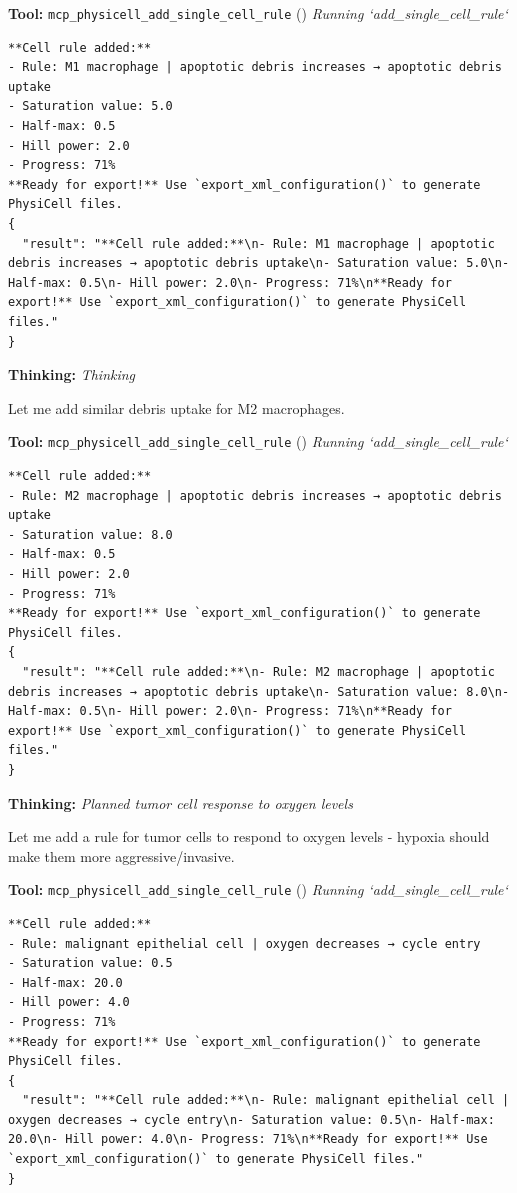\documentclass[11pt,a4paper]{article}
\begin{document}
\begin{toolokbox}
\textbf{Tool:} \texttt{mcp\_physicell\_add\_single\_cell\_rule} (\checkmark)
\textit{Running `add\_single\_cell\_rule`}
\begin{lstlisting}
**Cell rule added:**
- Rule: M1 macrophage | apoptotic debris increases → apoptotic debris uptake
- Saturation value: 5.0
- Half-max: 0.5
- Hill power: 2.0
- Progress: 71%
**Ready for export!** Use `export_xml_configuration()` to generate PhysiCell files.
{
  "result": "**Cell rule added:**\n- Rule: M1 macrophage | apoptotic debris increases → apoptotic debris uptake\n- Saturation value: 5.0\n- Half-max: 0.5\n- Hill power: 2.0\n- Progress: 71%\n**Ready for export!** Use `export_xml_configuration()` to generate PhysiCell files."
}
\end{lstlisting}
\end{toolokbox}
\begin{thinkbox}
\textbf{Thinking:} \textit{Thinking}

Let me add similar debris uptake for M2 macrophages.

\end{thinkbox}
\begin{toolokbox}
\textbf{Tool:} \texttt{mcp\_physicell\_add\_single\_cell\_rule} (\checkmark)
\textit{Running `add\_single\_cell\_rule`}
\begin{lstlisting}
**Cell rule added:**
- Rule: M2 macrophage | apoptotic debris increases → apoptotic debris uptake
- Saturation value: 8.0
- Half-max: 0.5
- Hill power: 2.0
- Progress: 71%
**Ready for export!** Use `export_xml_configuration()` to generate PhysiCell files.
{
  "result": "**Cell rule added:**\n- Rule: M2 macrophage | apoptotic debris increases → apoptotic debris uptake\n- Saturation value: 8.0\n- Half-max: 0.5\n- Hill power: 2.0\n- Progress: 71%\n**Ready for export!** Use `export_xml_configuration()` to generate PhysiCell files."
}
\end{lstlisting}
\end{toolokbox}
\begin{thinkbox}
\textbf{Thinking:} \textit{Planned tumor cell response to oxygen levels}

Let me add a rule for tumor cells to respond to oxygen levels - hypoxia should make them more aggressive/invasive.

\end{thinkbox}
\begin{toolokbox}
\textbf{Tool:} \texttt{mcp\_physicell\_add\_single\_cell\_rule} (\checkmark)
\textit{Running `add\_single\_cell\_rule`}
\begin{lstlisting}
**Cell rule added:**
- Rule: malignant epithelial cell | oxygen decreases → cycle entry
- Saturation value: 0.5
- Half-max: 20.0
- Hill power: 4.0
- Progress: 71%
**Ready for export!** Use `export_xml_configuration()` to generate PhysiCell files.
{
  "result": "**Cell rule added:**\n- Rule: malignant epithelial cell | oxygen decreases → cycle entry\n- Saturation value: 0.5\n- Half-max: 20.0\n- Hill power: 4.0\n- Progress: 71%\n**Ready for export!** Use `export_xml_configuration()` to generate PhysiCell files."
}
\end{lstlisting}
\end{toolokbox}
\end{document}
